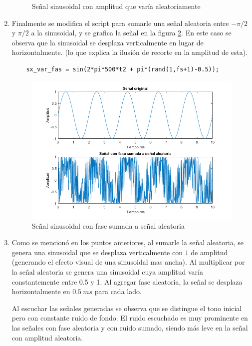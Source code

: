 \documentclass[letterpaper,onecolumn,10pt,journal,final]{IEEEtran}
\begin{document}
\begin{enumerate}[{1)}]
\begin{figure}[H]
        \caption{Señal sinusoidal con amplitud que varía aleatoriamente}
        \label{III5}
    \end{figure}
    \item
    Finalmente se modifica el script para sumarle una señal aleatoria entre $-\pi/2$ y $\pi/2$ a la sinusoidal, y se grafica la señal en la figura \ref{III6}. En este caso se observa que la sinusoidal se desplaza verticalmente en lugar de horizontalmente. (lo que explica la ilusión de recorte en la amplitud de esta).
    \begin{lstlisting}
    sx_var_fas = sin(2*pi*500*t2 + pi*(rand(1,fs+1)-0.5));
    \end{lstlisting}
    \begin{figure}
        \centering
        \includegraphics[width=0.7 \linewidth]{Figuras/plotIIIf.png}
        \caption{Señal sinusoidal con fase sumada a señal aleatoria}
        \label{III6}
    \end{figure}
    \item
    Como se mencionó en los puntos anteriores, al sumarle la señal aleatoria, se genera una sinusoidal que se desplaza verticalmente con $1$ de amplitud (generando el efecto visual de una sinusoidal mas ancha). Al multiplicar por la señal aleatoria se genera una sinusoidal cuya amplitud varía constantemente entre 0.5 y 1. Al agregar fase aleatoria, la señal se desplaza horizontalmente en $0.5~ms$ para cada lado.
    
    Al escuchar las señales generadas se observa que se distingue el tono inicial pero con constante ruido de fondo. El ruido escuchado es muy prominente en las señales con fase aleatoria y con ruido sumado, siendo más leve en la señal con amplitud aleatoria.
    
\end{enumerate}

%
%
\end{document}
